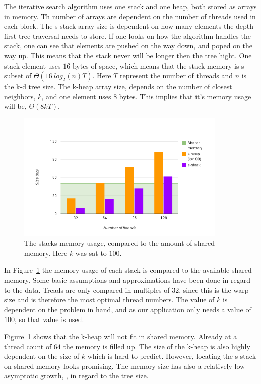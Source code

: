 The iterative search algorithm uses one stack and one heap, both stored as arrays in memory. Th number of arrays are dependent on the number of threads used in each block. The s-stack array size is dependent on how many elements the depth-first tree traversal needs to store. If one looks on how the algorithm handles the stack, one can see that elements are pushed on the way down, and poped on the way up. This means that the stack never will be longer then the tree hight. One stack element uses $16$ bytes of space, which means that the stack memory is s subset of $\Theta(16\ log_2(n)T)$. Here $T$ represent the number of threads and $n$ is the k-d tree size. The k-heap array size, depends on the number of closest neighbors, $k$, and one element uses $8$ bytes. This implies that it's memory usage will be, $\Theta(8kT)$.

\begin{figure}[ht!]
\centering
\includegraphics[width=100mm]{../gfx/shared_memory_and_stack.png}

\caption{The stacks memory usage, compared to the amount of shared memory. Here $k$ was sat to $100$.}
\label{fig:stacks_and_shared_memory}
\end{figure}

In Figure~\ref{fig:stacks_and_shared_memory} the memory usage of each stack is compared to the available shared memory. Some basic assumptions and approximations have been done in regard to the data. Treads are only compared in multiples of $32$, since this is the warp size and is therefore the most optimal thread numbers. The value of $k$ is dependent on the problem in hand, and as our application only needs a value of $100$, so that value is used. 

Figure~\ref{fig:stacks_and_shared_memory} shows that the k-heap will not fit in shared memory. Already at a thread count of $64$ the memory is filled up. The size of the k-heap is also highly dependent on the size of $k$ which is hard to predict. However, locating the s-stack on shared memory looks promising. The memory size has also a relatively low asymptotic growth, , in regard to the tree size.

